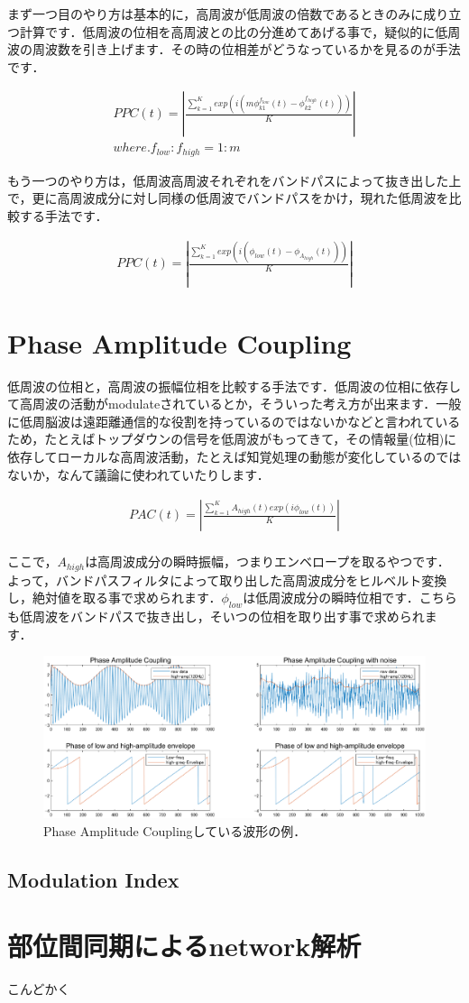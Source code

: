 \documentclass[11pt,a4paper]{ujreport} 	%
\begin{document}
まず一つ目のやり方は基本的に，高周波が低周波の倍数であるときのみに成り立つ計算です．低周波の位相を高周波との比の分進めてあげる事で，疑似的に低周波の周波数を引き上げます．その時の位相差がどうなっているかを見るのが手法です．

\begin{eqnarray}
  \label{eq:cfc}
  PPC(t) = |\frac{\sum_{k=1}^K exp(i( m \phi_{k1}^{f_{low}}(t) -\phi_{k2}^{f_{high}}(t)  ))}{K}| \\
  where. f_{low}:f_{high} = 1:m \nonumber
\end{eqnarray}

もう一つのやり方は，低周波高周波それぞれをバンドパスによって抜き出した上で，更に高周波成分に対し同様の低周波でバンドパスをかけ，現れた低周波を比較する手法です．

\begin{eqnarray}
  PPC(t) = |\frac{\sum_{k=1}^K exp(i(\phi_{low}(t) - \phi_{A_{high}}(t)))}{K}|
\end{eqnarray}


\section{Phase Amplitude Coupling}
低周波の位相と，高周波の振幅位相を比較する手法です．低周波の位相に依存して高周波の活動がmodulateされているとか，そういった考え方が出来ます．一般に低周脳波は遠距離通信的な役割を持っているのではないかなどと言われているため，たとえばトップダウンの信号を低周波がもってきて，その情報量(位相)に依存してローカルな高周波活動，たとえば知覚処理の動態が変化しているのではないか，なんて議論に使われていたりします．


\begin{eqnarray}
  \label{eq:pac}
  PAC(t) = |\frac{\sum_{k=1}^K A_{high}(t) exp(i\phi_{low}(t))}{K}|\\
\end{eqnarray}

ここで，$A_{high}$は高周波成分の瞬時振幅，つまりエンベロープを取るやつです．よって，バンドパスフィルタによって取り出した高周波成分をヒルベルト変換し，絶対値を取る事で求められます．$\phi_{low}$は低周波成分の瞬時位相です．こちらも低周波をバンドパスで抜き出し，そいつの位相を取り出す事で求められます．


\begin{figure}[H]
  \centering
  \includegraphics[width=15cm]{../figures/pac.eps}
  \caption{Phase Amplitude Couplingしている波形の例．}
\end{figure}


\subsection{Modulation Index}
\section{部位間同期によるnetwork解析}
こんどかく
\end{document}
